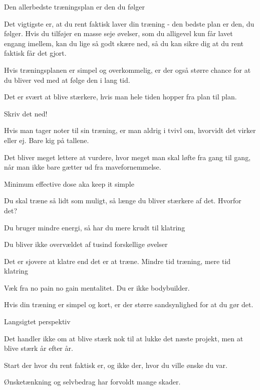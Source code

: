 \begin{multicols}{2}
  \begin{tList}{Den allerbedste træningsplan er den du følger}
  \item Det vigtigste er, at du rent faktisk laver din træning - den
    bedste plan er den, du følger. Hvis du tilføjer en masse seje
    øvelser, som du alligevel kun får lavet engang imellem, kan du
    lige så godt skære ned, så du kan sikre dig at du rent faktisk
    får det gjort.
  \item Hvis træningsplanen er simpel og overkommelig, er der også
    større chance for at du bliver ved med at følge den i lang tid.
  \item  Det er svært at blive stærkere, hvis man hele tiden hopper
    fra plan til plan.
  \end{tList}

  \begin{tList}{Skriv det ned!}
  \item Hvis man tager noter til sin træning, er man aldrig i tvivl
    om, hvorvidt det virker eller ej. Bare kig på tallene.
  \item Det bliver meget lettere at vurdere, hvor meget man skal
    løfte fra gang til gang, når man ikke bare gætter ud fra mavefornemmelse.
  \end{tList}
\columnbreak

  \begin{tList}{Minimum effective dose aka keep it simple}
  \item Du skal træne så lidt som muligt, så længe du bliver stærkere
    af det. Hvorfor det?

  \item Du bruger mindre energi, så har du mere krudt til klatring
  \item Du bliver ikke overvældet af tusind forskellige øvelser
  \item Det er sjovere at klatre end det er at træne. Mindre tid
    træning, mere tid klatring

  \item Væk fra no pain no gain mentalitet. Du er ikke bodybuilder.
  \item Hvis din træning er simpel og kort, er der større
    sandsynlighed for at du gør det.
  \end{tList}

  \begin{tList}{Langsigtet perspektiv}
  \item Det handler ikke om at blive stærk nok til at lukke det næste
    projekt, men at blive stærk år efter år.
  \item Start der hvor du rent faktisk er, og ikke der, hvor du ville
    ønske du var.

  \item Ønsketænkning og selvbedrag har forvoldt mange skader.
  \end{tList}

\end{multicols}
